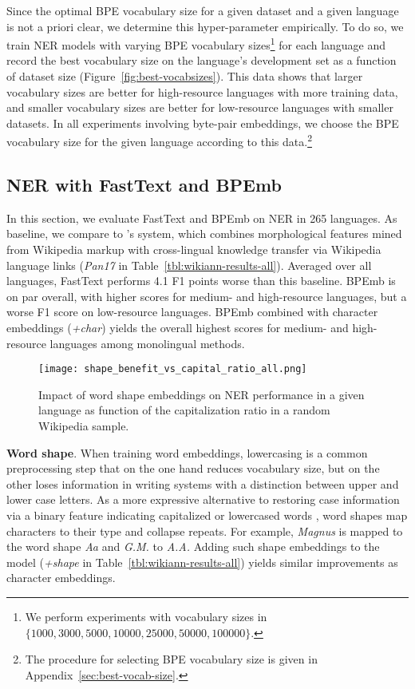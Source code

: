 \documentclass[11pt,a4paper]{article}
\begin{document}
Since the optimal BPE vocabulary size for a given dataset and a given language is not a priori clear, we determine this hyper-parameter empirically.
To do so, we train NER models with varying BPE vocabulary sizes\footnote{We perform experiments with vocabulary sizes in $\{1000, 3000, 5000, 10000, 25000, 50000, 100000\}$.
	} for each language and record the best vocabulary size on the language's development set as a function of dataset size (Figure~\ref{fig:best-vocabsizes}).
This data shows that larger vocabulary sizes are better for high-resource languages with more training data, and smaller vocabulary sizes are better for low-resource languages with smaller datasets.
In all experiments involving byte-pair embeddings, we choose the BPE vocabulary size for the given language according to this data.\footnote{The procedure for selecting BPE vocabulary size is given in Appendix~\ref{sec:best-vocab-size}.}

\subsection{NER with FastText and BPEmb}
\label{sec:ner-all}

In this section, we evaluate FastText and BPEmb on NER in 265 languages.
As baseline, we compare to \citet{pan2017crosslingual}'s system, which combines morphological features mined from Wikipedia markup with cross-lingual knowledge transfer via Wikipedia language links (\emph{Pan17} in Table~\ref{tbl:wikiann-results-all}).
Averaged over all languages, FastText performs 4.1 F1 points worse than this baseline.
BPEmb is on par overall, with higher scores for medium- and high-resource languages, but a worse F1 score on low-resource languages.
BPEmb combined with character embeddings (\emph{+char}) yields the overall highest scores for medium- and high-resource languages among monolingual methods.

\begin{figure}[t!]
	\centering
	\texttt{[image: shape\_benefit\_vs\_capital\_ratio\_all.png]}
	\caption{Impact of word shape embeddings on NER performance in a given language as function of the capitalization ratio in a random Wikipedia sample.}
	\label{fig:shape-benefit}
\end{figure}
\noindent\textbf{Word shape}. When training word embeddings, lowercasing is a common preprocessing step \citep{pennington2014glove} that on the one hand reduces vocabulary size, but on the other loses information in writing systems with a distinction between upper and lower case letters.
As a more expressive alternative to restoring case information via a binary feature indicating capitalized or lowercased words \cite{curran2003language}, word shapes \citep{collins2002ranking,finkel2005nonlocal} map characters to their type and collapse repeats.
For example, \emph{Magnus} is mapped to the word shape \emph{Aa} and \emph{G.M.} to \emph{A.A.}
Adding such shape embeddings to the model (\emph{+shape} in Table~\ref{tbl:wikiann-results-all}) yields similar improvements as character embeddings.
\end{document}
